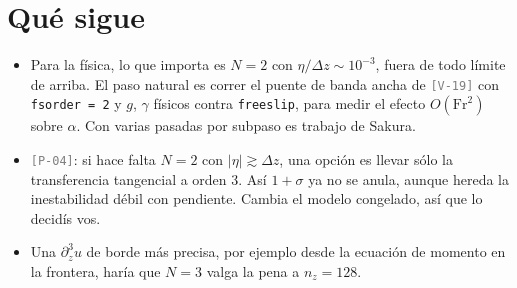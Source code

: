 \documentclass[11pt,a4paper]{article}
\newcommand{\etq}[1]{\textcolor{gray}{\texttt{[#1]}}}
\begin{document}
\section{Qué sigue}
\begin{itemize}
\item Para la física, lo que importa es $N=2$ con $\eta/\Delta z\sim10^{-3}$, fuera de todo
  límite de arriba. El paso natural es correr el puente de banda ancha de \etq{V-19} con
  \texttt{fsorder = 2} y $g$, $\gamma$ físicos contra \texttt{freeslip}, para medir el efecto
  $O(\mathrm{Fr}^2)$ sobre $\alpha$. Con varias pasadas por subpaso es trabajo de Sakura.
\item \etq{P-04}: si hace falta $N=2$ con $|\eta|\gtrsim\Delta z$, una opción es llevar sólo la
  transferencia tangencial a orden 3. Así $1+\sigma$ ya no se anula, aunque hereda la
  inestabilidad débil con pendiente. Cambia el modelo congelado, así que lo decidís vos.
\item Una $\partial_z^3u$ de borde más precisa, por ejemplo desde la ecuación de momento en la
  frontera, haría que $N=3$ valga la pena a $n_z=128$.
\end{itemize}
\end{document}
